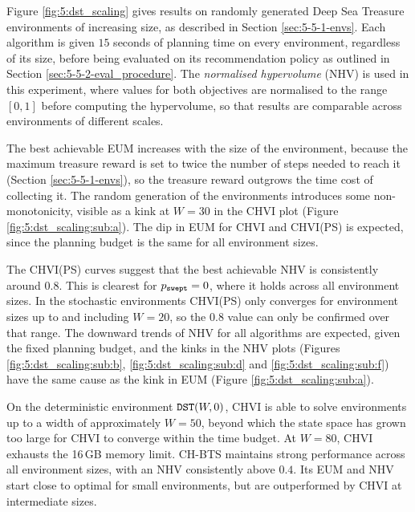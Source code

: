     Figure \ref{fig:5:dst_scaling} gives results on randomly generated Deep Sea Treasure environments of increasing size, as described in Section \ref{sec:5-5-1-envs}. Each algorithm is given $15$ seconds of planning time on every environment, regardless of its size, before being evaluated on its recommendation policy as outlined in Section \ref{sec:5-5-2-eval_procedure}. The \textit{normalised hypervolume} (NHV) is used in this experiment, where values for both objectives are normalised to the range $[0,1]$ before computing the hypervolume, so that results are comparable across environments of different scales.

    The best achievable EUM increases with the size of the environment, because the maximum treasure reward is set to twice the number of steps needed to reach it (Section \ref{sec:5-5-1-envs}), so the treasure reward outgrows the time cost of collecting it. The random generation of the environments introduces some non-monotonicity, visible as a kink at $W=30$ in the CHVI plot (Figure \ref{fig:5:dst_scaling:sub:a}). The dip in EUM for CHVI and CHVI(PS) is expected, since the planning budget is the same for all environment sizes.

    The CHVI(PS) curves suggest that the best achievable NHV is consistently around $0.8$. This is clearest for ${p_\textnormal{\texttt{swept}}}=0$, where it holds across all environment sizes. In the stochastic environments CHVI(PS) only converges for environment sizes up to and including $W=20$, so the $0.8$ value can only be confirmed over that range. The downward trends of NHV for all algorithms are expected, given the fixed planning budget, and the kinks in the NHV plots (Figures \ref{fig:5:dst_scaling:sub:b}, \ref{fig:5:dst_scaling:sub:d} and \ref{fig:5:dst_scaling:sub:f}) have the same cause as the kink in EUM (Figure \ref{fig:5:dst_scaling:sub:a}).

 
    On the deterministic environment ${\textnormal{\texttt{DST}}}(W,0)$, CHVI is able to solve environments up to a width of approximately $W=50$, beyond which the state space has grown too large for CHVI to converge within the time budget. At $W=80$, CHVI exhausts the 16\,GB memory limit. CH-BTS maintains strong performance across all environment sizes, with an NHV consistently above $0.4$. Its EUM and NHV start close to optimal for small environments, but are outperformed by CHVI at intermediate sizes. 

